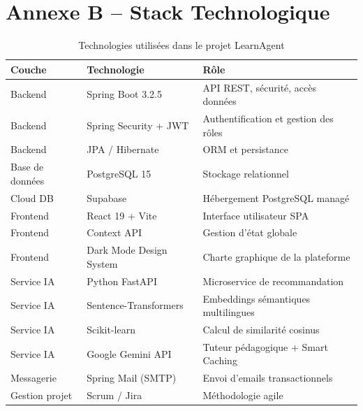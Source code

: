 \documentclass[12pt,a4paper]{report}
\begin{document}
\chapter{Annexe B -- Stack Technologique}

\begin{table}[H]
\centering
\renewcommand{\arraystretch}{1.25}
\caption{Technologies utilisées dans le projet LearnAgent}
\vspace{0.2cm}
\begin{tabularx}{\textwidth}{l l X}
\toprule
\textbf{Couche} & \textbf{Technologie} & \textbf{Rôle} \\
\midrule
Backend & Spring Boot 3.2.5 & API REST, sécurité, accès données \\
Backend & Spring Security + JWT & Authentification et gestion des rôles \\
Backend & JPA / Hibernate & ORM et persistance \\
Base de données & PostgreSQL 15 & Stockage relationnel \\
Cloud DB & Supabase & Hébergement PostgreSQL managé \\
\midrule
Frontend & React 19 + Vite & Interface utilisateur SPA \\
Frontend & Context API & Gestion d'état globale \\
Frontend & Dark Mode Design System & Charte graphique de la plateforme \\
\midrule
Service IA & Python FastAPI & Microservice de recommandation \\
Service IA & Sentence-Transformers & Embeddings sémantiques multilingues \\
Service IA & Scikit-learn & Calcul de similarité cosinus \\
Service IA & Google Gemini API & Tuteur pédagogique + Smart Caching \\
\midrule
Messagerie & Spring Mail (SMTP) & Envoi d'emails transactionnels \\
Gestion projet & Scrum / Jira & Méthodologie agile \\
\bottomrule
\end{tabularx}
\end{table}
\end{document}

